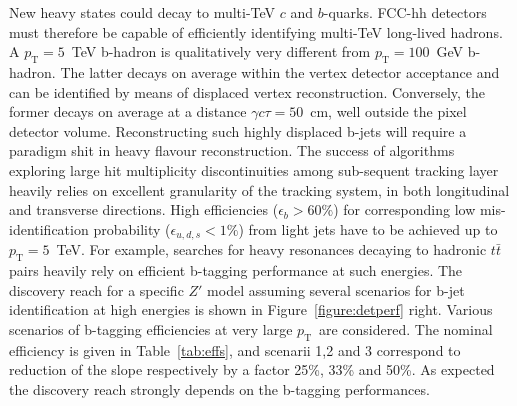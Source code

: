 \documentclass[a4paper,11pt]{article}
\newcommand{\pt}{\ensuremath{p_{\text{T}}}}
\newcommand*{\ttbar}{\ensuremath{t\bar{t}}}
\begin{document}
New heavy states could decay to multi-TeV $c$ and $b$-quarks. FCC-hh detectors must therefore be capable of efficiently identifying multi-TeV long-lived hadrons. A $\pt=5$~TeV b-hadron is qualitatively very different from $\pt=100$~GeV b-hadron. The latter decays on average within the vertex detector acceptance and can be identified by means of displaced vertex reconstruction. Conversely, the former decays on average at a distance $\gamma c \tau = 50$~cm, well outside the pixel detector volume. Reconstructing such highly displaced b-jets will require a paradigm shit in heavy flavour reconstruction. The success of algorithms exploring large hit multiplicity discontinuities among sub-sequent tracking layer heavily relies on excellent granularity of the tracking system, in both longitudinal and transverse directions. High efficiencies ($\epsilon_b > 60\%$) for corresponding low mis-identification probability ($\epsilon_{u,d,s} < 1\%$) from light jets have to be achieved up to $\pt=5$~TeV. For example, searches for heavy resonances decaying to hadronic $\ttbar$ pairs heavily rely on efficient b-tagging performance at such energies. The discovery reach for a specific $Z'$ model assuming several scenarios for b-jet identification at high energies is shown in Figure~\ref{figure:detperf} right. Various scenarios of b-tagging efficiencies at very large \pt\ are considered. The nominal efficiency is given in Table~\ref{tab:effs}, and scenarii 1,2 and 3 correspond to reduction of the slope respectively by a factor 25\%, 33\% and 50\%. As expected the discovery reach strongly depends on the b-tagging performances.
\end{document}
